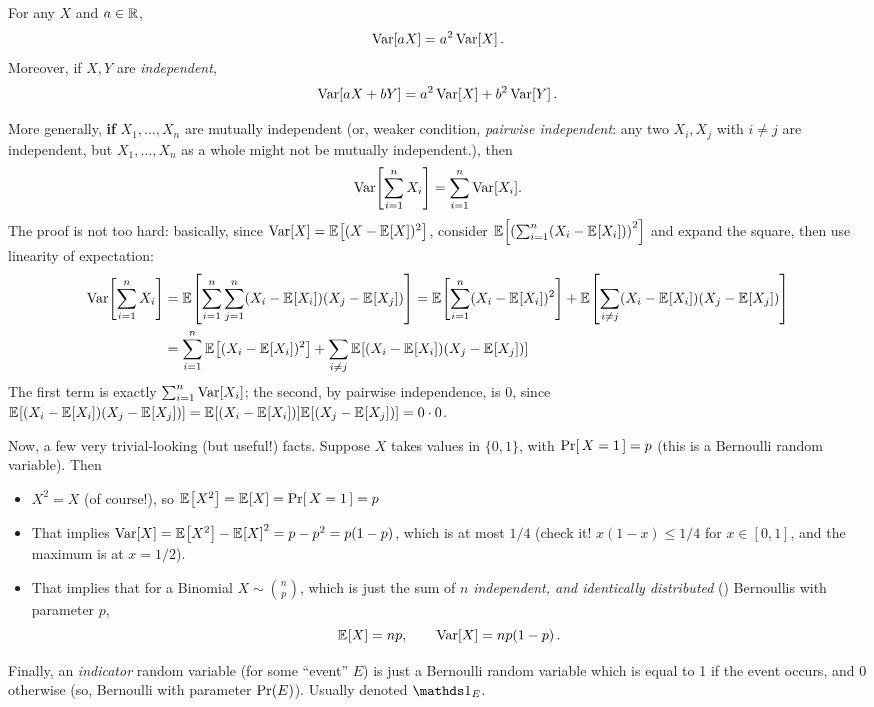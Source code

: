 \documentclass[10pt]{article}
\begin{document}
\begin{fact}[Variance]
For any $X$ and $a \in \mathbb{R}$,
\[
\operatorname{Var}[aX] = a^2 \operatorname{Var}[X]\,.
\]
Moreover, if $X,Y$ are \emph{independent}, 
\[
\operatorname{Var}[aX+bY] = a^2 \operatorname{Var}[X]+b^2 \operatorname{Var}[Y]\,.
\]
\end{fact}
More generally, \textbf{if} $X_1,\dots, X_n$ are mutually independent (or, weaker condition, \emph{pairwise independent}: any two $X_i,X_j$ with $i\neq j$ are independent, but $X_1,\dots, X_n$ as a whole might not be mutually independent.), then
\begin{equation}
\var\mleft[\sum_{i=1}^n X_i\mright] = \sum_{i=1}^n \var[X_i].
\end{equation}
The proof is not too hard: basically, since $\var[X] = \bEE{(X-\bEE{X})^2}$, consider 
$\bEE{\Paren{\sum_{i=1}^n (X_i-\bEE{X_i})}^2}$ and expand the square, then use linearity of expectation:
\begin{align*}
\var\mleft[\sum_{i=1}^n X_i\mright] 
&= \bEE{\sum_{i=1}^n\sum_{j=1}^n (X_i-\bEE{X_i})(X_j-\bEE{X_j})}
= \bEE{\sum_{i=1}^n(X_i-\bEE{X_i})^2} + \bEE{\sum_{i\neq j} (X_i-\bEE{X_i})(X_j-\bEE{X_j})}\\
&=\sum_{i=1}^n\bEE{(X_i-\bEE{X_i})^2} + \sum_{i\neq j} \bEE{(X_i-\bEE{X_i})(X_j-\bEE{X_j})}
\end{align*}
The first term is exactly $\sum_{i=1}^n\operatorname{Var}[X_i]$; the second, by pairwise independence, is 0, since $\bEE{(X_i-\bEE{X_i})(X_j-\bEE{X_j})} = \bEE{(X_i-\bEE{X_i})}\bEE{(X_j-\bEE{X_j})} = 0\cdot 0$.\medskip


Now, a few very trivial-looking (but useful!) facts. Suppose $X$ takes values in $\{0,1\}$, with $\probaOf{X=1}=p$ (this is a Bernoulli random variable). Then
\begin{itemize}
    \item $X^2=X$ (of course!), so $\bEE{X^2}=\bEE{X}=\probaOf{X=1}=p$
    \item That implies $\var[X] = \bEE{X^2}-\bEE{X}^2 = p-p^2 = p(1-p)$, which is at most $1/4$ (check it! $x(1-x)\leq 1/4$ for $x\in[0,1]$, and the maximum is at $x=1/2$).
    \item That implies that for a Binomial $X\sim\binom{n}{p}$, which is just the sum of $n$ \emph{independent, and identically distributed} (\iid) Bernoullis with parameter $p$,
    \[
        \bEE{X} = np, \qquad \var[X] = np(1-p)\,.
    \]
\end{itemize}
Finally, an \emph{indicator} random variable (for some ``event'' $E$) is just a Bernoulli random variable which is equal to 1 if the event occurs, and 0 otherwise (so, Bernoulli with parameter $\Pr(E)$). Usually denoted $\indicSet{E}$.
\end{document}
